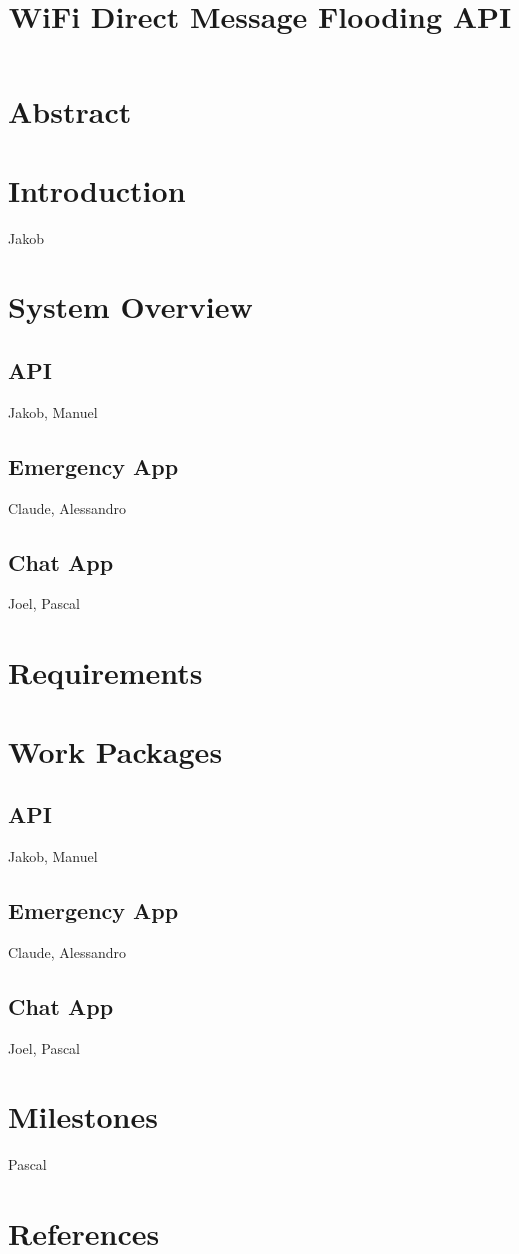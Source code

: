 \documentclass[10pt,a4paper]{report}
\title{WiFi Direct Message Flooding API}
\begin{document}
	
	\maketitle
	
	\section{Abstract}
	
	\section{Introduction}
		Jakob
	
	\section{System Overview}
		
		\subsection{API}
		Jakob, Manuel
		
		\subsection{Emergency App}
		Claude, Alessandro
		
		\subsection{Chat App}
		Joel, Pascal
	
	\section{Requirements}
		
	
	\section{Work Packages}
	
		\subsection{API}
			Jakob, Manuel
		
		\subsection{Emergency App}
			Claude, Alessandro
		
		\subsection{Chat App}
			Joel, Pascal
	
	\section{Milestones}
		Pascal
	
	\section{References}
	
	
\end{document}
